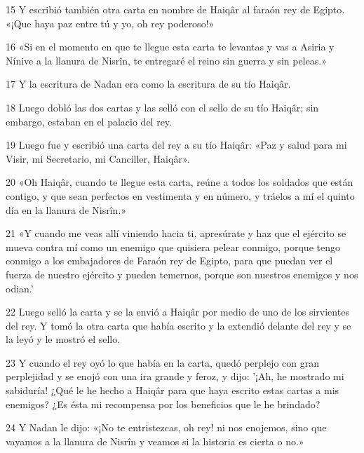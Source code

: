 \par 15 Y escribió también otra carta en nombre de Haiqâr al faraón rey de Egipto. «¡Que haya paz entre tú y yo, oh rey poderoso!»

\par 16 «Si en el momento en que te llegue esta carta te levantas y vas a Asiria y Nínive a la llanura de Nisrîn, te entregaré el reino sin guerra y sin peleas.»

\par 17 Y la escritura de Nadan era como la escritura de su tío Haiqâr.

\par 18 Luego dobló las dos cartas y las selló con el sello de su tío Haiqâr; sin embargo, estaban en el palacio del rey.

\par 19 Luego fue y escribió una carta del rey a su tío Haiqâr: «Paz y salud para mi Visir, mi Secretario, mi Canciller, Haiqâr».

\par 20 «Oh Haiqâr, cuando te llegue esta carta, reúne a todos los soldados que están contigo, y que sean perfectos en vestimenta y en número, y tráelos a mí el quinto día en la llanura de Nisrîn.»

\par 21 «Y cuando me veas allí viniendo hacia ti, apresúrate y haz que el ejército se mueva contra mí como un enemigo que quisiera pelear conmigo, porque tengo conmigo a los embajadores de Faraón rey de Egipto, para que puedan ver el fuerza de nuestro ejército y pueden temernos, porque son nuestros enemigos y nos odian.'

\par 22 Luego selló la carta y se la envió a Haiqâr por medio de uno de los sirvientes del rey. Y tomó la otra carta que había escrito y la extendió delante del rey y se la leyó y le mostró el sello.

\par 23 Y cuando el rey oyó lo que había en la carta, quedó perplejo con gran perplejidad y se enojó con una ira grande y feroz, y dijo: '¡Ah, he mostrado mi sabiduría! ¿Qué le he hecho a Haiqâr para que haya escrito estas cartas a mis enemigos? ¿Es ésta mi recompensa por los beneficios que le he brindado?

\par 24 Y Nadan le dijo: «¡No te entristezcas, oh rey! ni nos enojemos, sino que vayamos a la llanura de Nisrîn y veamos si la historia es cierta o no.»

